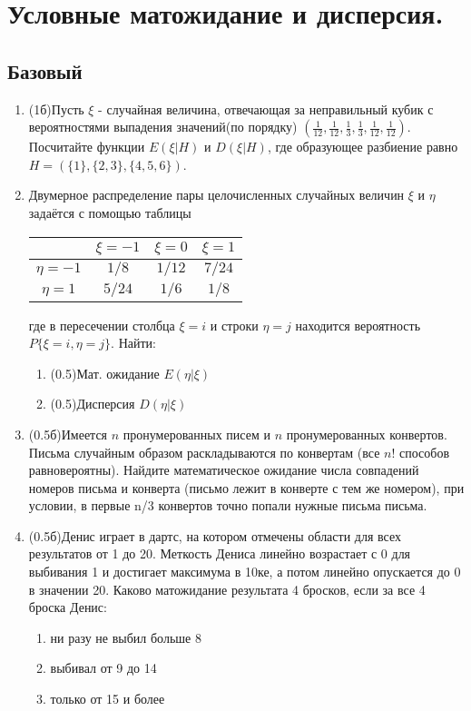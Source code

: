 \documentclass[a4paper, 14pt]{extarticle}
\begin{document}
\section*{Условные матожидание и дисперсия.}
\subsection*{Базовый}
\begin{enumerate}
\item (1б)Пусть $\xi$ - случайная величина, отвечающая за неправильный кубик с вероятностями выпадения значений(по порядку) $(\frac{1}{12}, \frac{1}{12},\frac{1}{3}, \frac{1}{3},\frac{1}{12},\frac{1}{12})$. Посчитайте функции $E(\xi|H)$ и $D(\xi|H)$, где образующее разбиение равно $H = (\{1\}, \{2,3\}, \{4,5,6\})$.
\item 
Двумерное распределение пары целочисленных случайных величин $\xi$ и $\eta$ задаётся с помощью таблицы

\begin{center}
\begin{tabular}{|c|c|c|c|}
\hline
 & $\xi = -1$ & $\xi = 0$ & $\xi = 1$\\
\hline
$\eta = -1$ & $1/8$ & $1/12$ & $7/24$\\ 
\hline
$\eta = 1$ & $5/24$ & $1/6$ & $1/8$\\ 
\hline
\end{tabular}


\end{center}
где в пересечении столбца $\xi = i$ и строки $\eta = j$ находится вероятность $P\lbrace{\xi = i, \eta = j\rbrace}$. Найти:

\begin{enumerate}
    \item (0.5)Мат. ожидание $E(\eta|\xi)$
    \item (0.5)Дисперсия $D(\eta|\xi)$
\end{enumerate}
	
	\item (0.5б)Имеется $n$ пронумерованных писем и $n$ пронумерованных конвертов. Письма случайным образом раскладываются по конвертам (все $n!$
	способов равновероятны). Найдите математическое ожидание числа
	совпадений номеров письма и конверта (письмо лежит в конверте с
	тем же номером), при условии, в первые n/3 конвертов точно попали нужные письма письма.
	
	\item (0.5б)Денис играет в дартс, на котором отмечены области для всех результатов от 1 до 20. Меткость Дениса линейно возрастает с 0 для выбивания 1 и достигает максимума в 10ке, а потом линейно опускается до 0 в значении 20. Каково матожидание результата 4 бросков, если за все 4 броска Денис:
	\begin{enumerate}
	    	\item ни разу не выбил больше 8
	\item выбивал от 9 до 14
	\item только от 15 и более
	\end{enumerate}
\end{enumerate}
\end{document}
